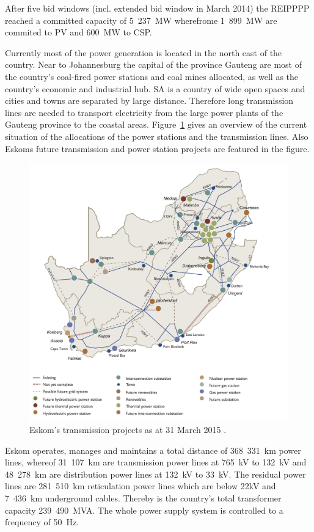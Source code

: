 After five bid windows (incl. extended bid window in March 2014) the REIPPPP reached a committed capacity of 5~237~MW wherefrome 1~899~MW are commited to PV and 600~MW to CSP. \cite{DoE2015}

Currently most of the power generation is located in the north east of the country. Near to Johannesburg the capital of the province Gauteng are most of the country’s coal-fired power stations and coal mines allocated, as well as the country’s economic and industrial hub. SA is a country of wide open spaces and cities and towns are separated by large distance. Therefore long transmission lines are needed to transport electricity from the large power plants of the Gauteng province to the coastal areas. Figure~\ref{transmissionprojekts} gives an overview of the current situation of the allocations of the power stations and the transmission lines. Also Eskoms future transmission and power station projects are featured in the figure.

\begin{figure}[htbp]
\centering
\includegraphics[width=1\linewidth]{FIG/transmissionprojekts}
\caption[Eskom’s transmission projects as at 31 March 2015.]{Eskom’s transmission projects as at 31 March 2015 \cite{Eskom2015a}.}\label{transmissionprojekts}
\end{figure}
Eskom operates, manages and maintains a total distance of 368~331~km power lines, whereof 31~107~km are transmission power lines at 765~kV to 132~kV and 48~278~km are distribution power lines at 132~kV to 33~kV. The residual power lines are 281~510~km reticulation power lines which are below 22kV and 7~436~km underground cables. Thereby is the country's total transformer capacity 239~490~MVA. The whole power supply system is controlled to a frequency of 50~Hz. \cite{Eskom2015b}

